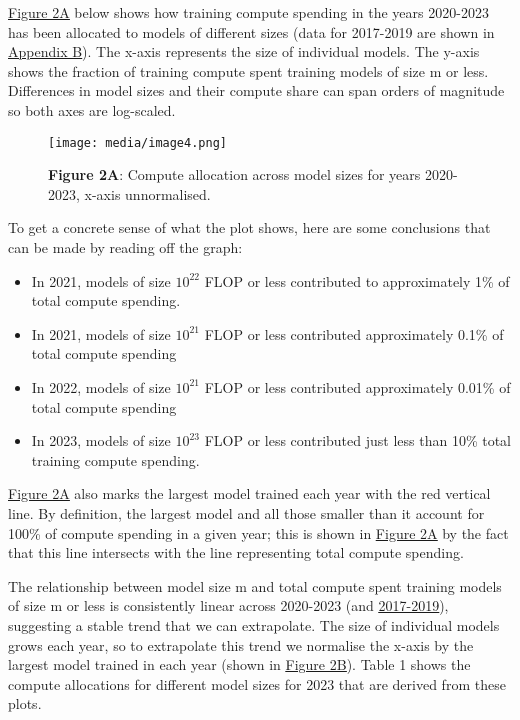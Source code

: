 \documentclass[11pt]{article}
\begin{document}
\underline{\hyperref[figure-2a-compute-allocation-across-model-sizes-for-years-2020-2023-x-axis-unnormalised.]{Figure 2A}} below shows how training compute spending in the years 2020-2023 has been allocated to models of different sizes (data for 2017-2019 are shown in \underline{\hyperref[appendix-b-compute-allocations-for-2017-2019]{Appendix B}}). The x-axis represents the size of individual models. The y-axis shows the fraction of training compute spent training models of size m or less. Differences in model sizes and their compute share can span orders of magnitude so both axes are log-scaled.

\begin{figure}[h]
\centering
\texttt{[image: media/image4.png]}
\caption*{\textbf{Figure 2A}: Compute allocation across model sizes for years 2020-2023, x-axis unnormalised.}
\label{figure-2a-compute-allocation-across-model-sizes-for-years-2020-2023-x-axis-unnormalised.}
\end{figure}

To get a concrete sense of what the plot shows, here are some conclusions that can be made by reading off the graph:

\begin{itemize}
\item In 2021, models of size $10^{22}$ FLOP or less contributed to approximately 1\% of total compute spending.
\item In 2021, models of size $10^{21}$ FLOP or less contributed approximately 0.1\% of total compute spending
\item In 2022, models of size $10^{21}$ FLOP or less contributed approximately 0.01\% of total compute spending
\item In 2023, models of size $10^{23}$ FLOP or less contributed just less than 10\% total training compute spending.
\end{itemize}

\underline{\hyperref[figure-2a-compute-allocation-across-model-sizes-for-years-2020-2023-x-axis-unnormalised.]{Figure 2A}} also marks the largest model trained each year with the red vertical line. By definition, the largest model and all those smaller than it account for 100\% of compute spending in a given year; this is shown in \underline{\hyperref[figure-2a-compute-allocation-across-model-sizes-for-years-2020-2023-x-axis-unnormalised.]{Figure 2A}} by the fact that this line intersects with the line representing total compute spending.

The relationship between model size m and total compute spent training models of size m or less is consistently linear across 2020-2023 (and \underline{\hyperref[appendix-b-compute-allocations-for-2017-2019]{2017-2019}}), suggesting a stable trend that we can extrapolate. The size of individual models grows each year, so to extrapolate this trend we normalise the x-axis by the largest model trained in each year (shown in \underline{\hyperref[figure-2b-compute-allocation-amongst-model-sizes-for-years-2020-2023-x-axis-normalised-by-largest-model-trained-that-year.-linear-fit-shown.]{Figure 2B}}). Table 1 shows the compute allocations for different model sizes for 2023 that are derived from these plots.
\end{document}
